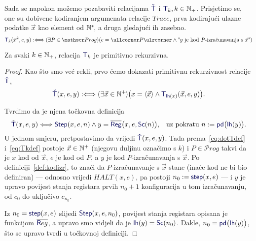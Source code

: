 Sada se napokon možemo pozabaviti relacijama $\f{\check T}$ i $\f T_k,k\in\N_+$. Prisjetimo se, one su dobivene kodiranjem argumenata relacije $T\!race$, prva kodirajući ulazne podatke $\vec x$ kao element od ${\mathbb N}^*\!$, a druga gledajući ih zasebno.
\begin{equation}\label{eq:Tkdef}
    \f T_k(\vec x^k,e,y):\Longleftrightarrow(\exists P\in\mathscr Prog)(e=\kprog{P}\land \text{"$y$ je kod $P$-izračunavanja s $\vec x$"})
\end{equation}

\begin{propozicija}[{name=[primitivna rekurzivnost Kleenejeve relacije]}]\label{prop:Tkprn}
Za svaki $k\in{\mathbb N}_+$, relacija $\f T_k$ je primitivno rekurzivna.
\end{propozicija}
\begin{proof}
Kao što smo već rekli, prvo ćemo dokazati primitivnu rekurzivnost relacije $\f{\check T}$,
\begin{equation}\label{eq:dotTdef}
	\f{\check T}(x,e,y):\Longleftrightarrow(\exists\vec x\in\N^+\mspace{-2mu})\bigl(x=\langle\vec x\rangle\land\f T_{\f{lh}(x)}(\vec x,e,y)\bigr)\text.
\end{equation}

Tvrdimo da je njena točkovna definicija
\begin{equation*}
    \check{\f T}(x,e,y)\Longleftrightarrow\f{Step}(x,e,n)\land y=\overline{\f{Reg}}\bigl(x,e,\f{Sc}(n)\bigr)\text{,\quad uz pokratu }n:=\f{pd}\big(\f{lh}(y)\bigr)\text.
\end{equation*}
U jednom smjeru, pretpostavimo da vrijedi $\f{\check T}(x,e,y)$. Tada prema~\eqref{eq:dotTdef} i~\eqref{eq:Tkdef} postoje $\vec x\in{\mathbb N}^+$ (njegovu duljinu označimo s $k$) i $P\in\mathscr Prog$ takvi da je $x$ kod od $\vec x$, $e$ je kod od $P$, a $y$ je kod $P$-izračunavanja s $\vec x$. Po definiciji~\ref{def:kodizr}, to znači da $P$-izračunavanje s $\vec x$ stane (inače kod ne bi bio definiran) --- odnosno vrijedi $HALT(x,e)$, pa postoji $n_0:=\f{step}(x,e)$ --- i $y$ je upravo povijest stanja registara prvih $n_0+1$ konfiguracija u tom izračunavanju, od $c_0$ do uključivo $c_{n_0}$.

Iz $n_0=\f{step}(x,e)$ slijedi $\f{Step}(x,e,n_0)$, povijest stanja registara opisana je funkcijom $\overline{\f Reg}$, a upravo smo vidjeli da je $\f{lh}(y)=\f{Sc}(n_0)$. Dakle, $n_0=\f{pd}\bigl(\f{lh}(y)\bigr)$, što se upravo tvrdi u točkovnoj definiciji.


\end{proof}
